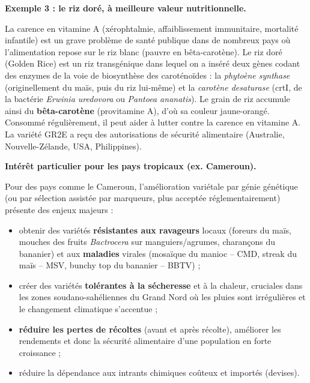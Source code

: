 \documentclass[11pt]{article}
\newcommand{\cle}[1]{{\popxbold\color{popdark}#1}}
\newcounter{popsec}
\newcounter{popsub}
\newcommand{\courssub}[1]{%
  \stepcounter{popsub}%
  \par\vspace{9pt}\noindent{\popxbold\fontsize{11.5}{13}\selectfont\color{popink}{\color{poporange}\thepopsec.\thepopsub}\hspace{6pt}#1}\par\nopagebreak\vspace{4pt}
}
\begin{document}
\textbf{Exemple 3 : le riz doré, à meilleure valeur nutritionnelle.}\par
La carence en vitamine A (xérophtalmie, affaiblissement immunitaire, mortalité infantile) est un grave problème de santé publique dans de nombreux pays où l'alimentation repose sur le riz blanc (pauvre en bêta-carotène). Le \cle{riz doré} (Golden Rice) est un riz transgénique dans lequel on a inséré deux gènes codant des enzymes de la voie de biosynthèse des caroténoïdes : la \emph{phytoène synthase} (originellement du maïs, puis du riz lui-même) et la \emph{carotène desaturase} (crtI, de la bactérie \emph{Erwinia uredovora} ou \emph{Pantoea ananatis}). Le grain de riz accumule ainsi du \textbf{bêta-carotène} (provitamine A), d'où sa couleur jaune-orangé. Consommé régulièrement, il peut aider à lutter contre la carence en vitamine A. La variété GR2E a reçu des autorisations de sécurité alimentaire (Australie, Nouvelle-Zélande, USA, Philippines).

\textbf{Intérêt particulier pour les pays tropicaux (ex. Cameroun).}\par
Pour des pays comme le Cameroun, l'amélioration variétale par génie génétique (ou par sélection assistée par marqueurs, plus acceptée réglementairement) présente des enjeux majeurs :
\begin{itemize}
\item obtenir des variétés \textbf{résistantes aux ravageurs} locaux (foreurs du maïs, mouches des fruits \emph{Bactrocera} sur manguiers/agrumes, charançons du bananier) et aux \textbf{maladies} virales (mosaïque du manioc -- CMD, streak du maïs -- MSV, bunchy top du bananier -- BBTV) ;
\item créer des variétés \textbf{tolérantes à la sécheresse} et à la chaleur, cruciales dans les zones soudano-sahéliennes du Grand Nord où les pluies sont irrégulières et le changement climatique s'accentue ;
\item \textbf{réduire les pertes de récoltes} (avant et après récolte), améliorer les rendements et donc la sécurité alimentaire d'une population en forte croissance ;
\item réduire la dépendance aux intrants chimiques coûteux et importés (devises).
\end{itemize}

\courssub{Autres domaines d'application}
\end{document}
